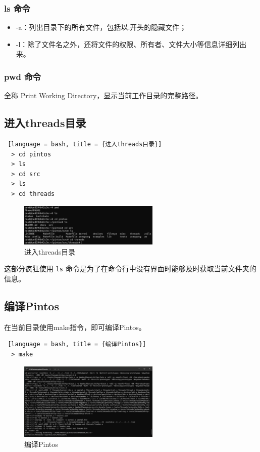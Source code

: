 \subsubsection{ls 命令}
\begin{itemize} 
  \item -a：列出目录下的所有文件，包括以.开头的隐藏文件； 
  \item -l：除了文件名之外，还将文件的权限、所有者、文件大小等信息详细列出来。 
\end{itemize} 

\subsubsection{pwd 命令}

全称 Print Working Directory，显示当前工作目录的完整路径。

\subsection{进入threads目录}

\begin{lstlisting} [language = bash, title = {进入threads目录}]
  > cd pintos
  > ls
  > cd src
  > ls
  > cd threads
\end{lstlisting}

\begin{figure} [H]
  \centering
  \includegraphics[width=0.6\textwidth]{img1/EnterThreads.png}
  \caption{进入threads目录}
  \label{fig:threads}
\end{figure}

这部分疯狂使用 \texttt{ls} 命令是为了在命令行中没有界面时能够及时获取当前文件夹的信息。

\subsection{编译Pintos}
在当前目录使用make指令，即可编译Pintos。
\begin{lstlisting} [language = bash, title = {编译Pintos}]
  > make
\end{lstlisting}

\begin{figure} [H]
  \centering
  \includegraphics[width=0.6\textwidth]{img1/Make.png}
  \caption{编译Pintos}
  \label{fig:make}
\end{figure}

